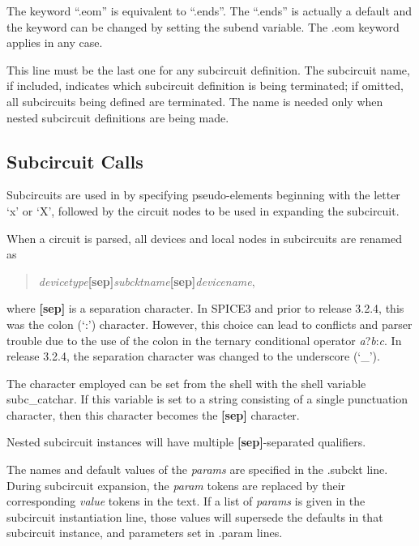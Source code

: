 The keyword ``{\vt .eom}'' is equivalent to ``{\vt .ends}''.  The
``{\vt .ends}'' is actually a default and the keyword can be changed
by setting the {\et subend} variable.  The {\vt .eom} keyword applies
in any case.

This line must be the last one for any subcircuit definition.  The
subcircuit name, if included, indicates which subcircuit
definition is being terminated; if omitted, all subcircuits being
defined are terminated.  The name is needed only when nested
subcircuit definitions are being made.

\subsection{Subcircuit Calls}

Subcircuits are used in {\WRspice} by specifying pseudo-elements
beginning with the letter `{\vt x}' or `{\vt X}', followed by the
circuit nodes to be used in expanding the subcircuit.

When a circuit is parsed, all devices and local nodes in subcircuits
are renamed as
\begin{quote}
{\it devicetype\/}{\bf [sep]}{\it subcktname\/}{\bf [sep]}{\it devicename\/},
\end{quote}
where {\bf [sep]} is a separation character. 
In SPICE3 and {\WRspice} prior to release 3.2.4, this was the colon
(`:') character.  However, this choice can lead to conflicts and
parser trouble due to the use of the colon in the ternary conditional
operator {\it a\/}{\vt ?}{\it b\/}{\vt :}{\it c\/}.  In release 3.2.4,
the separation character was changed to the underscore (`{\vt \_}').

The character employed can be set from the shell with the shell
variable {\et subc\_catchar}.  If this variable is set to a string
consisting of a single punctuation character, then this character
becomes the {\bf [sep]} character. 

Nested subcircuit instances will have multiple {\bf [sep]}-separated
qualifiers.

The names and default values of the {\it params} are specified in the
{\vt .subckt} line.  During subcircuit expansion, the {\it param}
tokens are replaced by their corresponding {\it value} tokens in the
text.  If a list of {\it params} is given in the subcircuit
instantiation line, those values will supersede the defaults in that
subcircuit instance, and parameters set in {\vt .param} lines.

